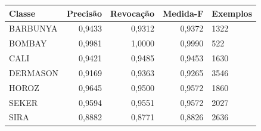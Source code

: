 \begin{tabular}{lrrrl}
\toprule
Classe & Precisão & Revocação & Medida-F & Exemplos \\
\midrule
BARBUNYA & 0,9433 & 0,9312 & 0,9372 & 1322 \\
BOMBAY & 0,9981 & 1,0000 & 0,9990 & 522 \\
CALI & 0,9421 & 0,9485 & 0,9453 & 1630 \\
DERMASON & 0,9169 & 0,9363 & 0,9265 & 3546 \\
HOROZ & 0,9645 & 0,9500 & 0,9572 & 1860 \\
SEKER & 0,9594 & 0,9551 & 0,9572 & 2027 \\
SIRA & 0,8882 & 0,8771 & 0,8826 & 2636 \\
\bottomrule
\end{tabular}

